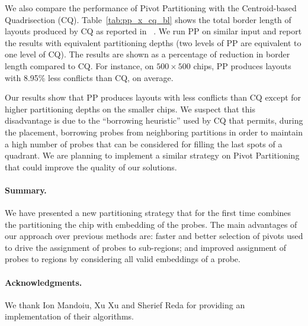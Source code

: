 \documentclass{llncs}
\newcommand{\ignore}[1]{}
\begin{document}
\ignore{
Tables~\ref{tab:pp_affy_bl} and~\ref{tab:pp_affy_ci} shows the results of running PP on chips
containing probe sets of existing Affymetrix GeneChip arrays -- E.Coli 2.0 Genome (EC2), Porcine
Genome (POR) and Wheat Genome (WHT) -- whose probes are synchronously embedded in a deposition
sequence of length 74. Table~\ref{tab:pp_affy_bl} shows the normalized border length
(total border length divided by the number of probes) while Table~\ref{tab:pp_affy_ci} shows
the average conflict index.
} %

We also compare the performance of Pivot Partitioning with the
Centroid-based Quadrisection (CQ). Table~\ref{tab:pp_x_cq_bl} shows the total border
length of layouts produced by CQ as reported in ~\cite{KAHNG03B}. We run PP
on similar input and report the results with equivalent partitioning depths
(two levels of PP are equivalent to one level of CQ). The results are shown
as a percentage of reduction in border length compared to CQ. For instance,
on $500\times 500$ chips, PP produces layouts with 8.95\% less conflicts than
CQ, on average.

Our results show that PP produces layouts with less conflicts than CQ except
for higher partitioning depths on the smaller chips. We suspect that this
disadvantage is due to the ``borrowing heuristic'' used by CQ that permits,
during the placement, borrowing probes from neighboring partitions in order to
maintain a high number of probes that can be considered for filling the last
spots of a quadrant. We are planning to implement a similar strategy on Pivot
Partitioning that could improve the quality of our solutions.

\paragraph{Summary.}
We have presented a new partitioning strategy that for the first time combines
the partitioning the chip with embedding of the probes. The main advantages of
our approach over previous methods are: faster and better selection of pivots
used to drive the assignment of probes to sub-regions; and improved assignment
of probes to regions by considering all valid embeddings of a probe.

\paragraph{Acknowledgments.}We thank Ion Mandoiu, Xu Xu and Sherief Reda for
providing an implementation of their algorithms.
\end{document}
